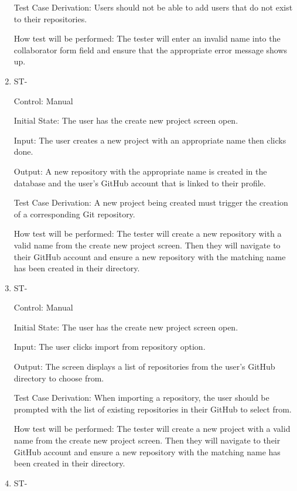 \documentclass[12pt, titlepage]{article}
\newcounter{TESTID}
\newcommand\TESTNUM{\stepcounter{TESTID}\theTESTID}
\begin{document}
\begin{enumerate}
		Test Case Derivation: Users should not be able to add users that do not exist to their repositories.
		
		How test will be performed: The tester will enter an invalid name into the collaborator form field and ensure that the appropriate error message shows up.
		
		\item{ST-\TESTNUM\\}
		
		Control: Manual
		
		Initial State: The user has the create new project screen open.
		
		Input: The user creates a new project with an appropriate name then clicks done.
		
		Output: A new repository with the appropriate name is created in the database and the user's GitHub account that is linked to their profile. 
		
		Test Case Derivation: A new project being created must trigger the creation of a corresponding Git repository.
		
		How test will be performed: The tester will create a new repository with a valid name from the create new project screen. Then they will navigate to their GitHub account and ensure a new repository with the matching name has been created in their directory.
		
		\item{ST-\TESTNUM\\}
		
		Control: Manual
		
		Initial State: The user has the create new project screen open.
		
		Input: The user clicks import from repository option.
		
		Output: The screen displays a list of repositories from the user's GitHub directory to choose from.
		
		Test Case Derivation: When importing a repository, the user should be prompted with the list of existing repositories in their GitHub to select from. 
		
		How test will be performed: The tester will create a new project with a valid name from the create new project screen. Then they will navigate to their GitHub account and ensure a new repository with the matching name has been created in their directory.
		
		\item{ST-\TESTNUM\\}
		

\end{enumerate}
\end{document}
